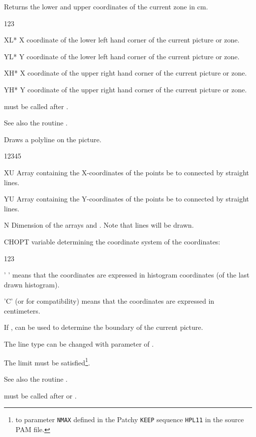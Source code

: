 \Action
Returns the lower and upper coordinates of the current zone in cm.
\Pdesc
\begin{DLtt}{123}
\item[XL*] X coordinate of the lower left hand corner of the current picture or
           zone.
\item[YL*] Y coordinate of the lower left hand corner of the current picture or
           zone.
\item[XH*] X coordinate of the upper right hand corner of the current picture or
           zone.
\item[YH*] Y coordinate of the upper right hand corner of the current picture or
           zone.
\end{DLtt}
\Remarks
\begin{UL}
\item {} must be called after .
\item See also the \HIGZ{} routine .
\end{UL}


\Action
Draws a polyline on the picture.
\Pdesc
\begin{DLtt}{12345}
\item[XU]    Array containing the X-coordinates of the points be to connected
             by straight lines.
\item[YU]    Array containing the Y-coordinates of the points be to connected
             by straight lines.
\item[N]     Dimension of the arrays  and . Note that 
             lines will be drawn.
\item[CHOPT] \CHARACTER{} variable determining the coordinate system of the
              coordinates:
\begin{DLtt}{123}
   \item[' '] means that the coordinates are expressed in histogram coordinates
              (of the last drawn histogram).
   \item['C'] (or  for compatibility) means that the coordinates are
              expressed in centimeters.
\end{DLtt}
\end{DLtt}
\Remarks
\begin{UL}
\item If ,  can be used to determine the boundary
      of the current picture.
\item The line type can be changed with parameter  of .
\item The limit  must be satisfied\footnote{%
      to parameter {\tt NMAX} defined in the Patchy {\tt KEEP} sequence
      {\tt HPL11} in the \HPLOT{} source PAM file.}.
\item See also the \HIGZ{} routine .
\item {} must be called after  or .
\end{UL}


